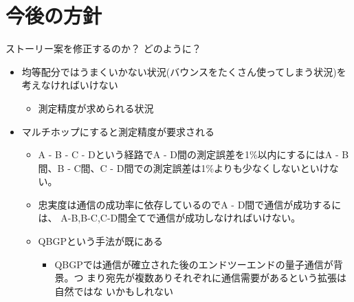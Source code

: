 \documentclass[conference]{IEEEtran}
\begin{document}
\section{今後の方針}
\label{sec:orgc43d4ae}
ストーリー案を修正するのか？
どのように？
\begin{itemize}
\item 均等配分ではうまくいかない状況(バウンスをたくさん使ってしまう状況)を考えなければいけない
\begin{itemize}
\item 測定精度が求められる状況
\end{itemize}
\item マルチホップにすると測定精度が要求される
\begin{itemize}
\item A - B - C - Dという経路でA - D間の測定誤差を1\%以内にするにはA - B
間、B - C間、C - D間での測定誤差は1\%よりも少なくしないといけない。
\item 忠実度は通信の成功率に依存しているのでA - D間で通信が成功するには、
A-B,B-C,C-D間全てで通信が成功しなければいけない。
\item QBGPという手法が既にある
\begin{itemize}
\item QBGPでは通信が確立された後のエンドツーエンドの量子通信が背景。つ
まり宛先が複数ありそれぞれに通信需要があるという拡張は自然ではな
いかもしれない
\end{itemize}
\end{itemize}
\end{itemize}
\end{document}
